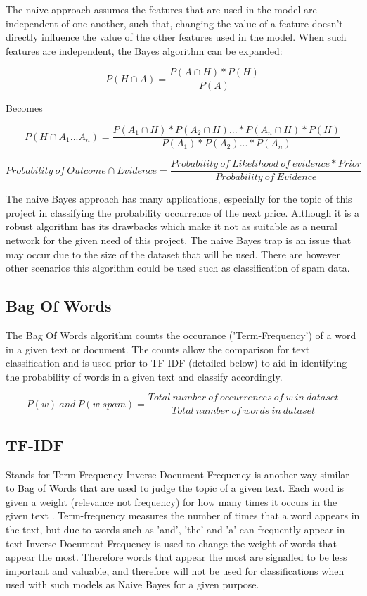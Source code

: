 \documentclass[oneside, 12pt]{article}
\begin{document}
			The naive approach assumes the features that are used in the model are independent of one another, such that, changing the value of a feature doesn't directly influence the value of the other features used in the model. When such features are independent, the Bayes algorithm can be expanded:
			
			\[P(H\cap A) = \frac{P(A\cap H) * P(H)}{P(A)} \]
			
			\begin{center}
				Becomes
			\end{center}
			
			\[P(H\cap A_1 ... A_n) = \frac{P(A_1\cap H) * P(A_2\cap H) ... * P(A_n\cap H) * P(H)}{P(A_1) * P(A_2) ... * P(A_n)} \]
			
			\[Probability \ of \ Outcome \cap Evidence = \frac{Probability \ of \ Likelihood \ of \ evidence * Prior}{Probability \ of \ Evidence} \]
			
			The naive Bayes approach has many applications, especially for the topic of this project in classifying the probability occurrence of the next price. Although it is a robust algorithm has its drawbacks which make it not as suitable as a neural network for the given need of this project. The naive Bayes trap is an issue that may occur due to the size of the dataset that will be used. There are however other scenarios this algorithm could be used such as classification of spam data.\cite{StudyNBC}
			
			\subsection{Bag Of Words}
			The Bag Of Words algorithm counts the occurance ('Term-Frequency') of a word in a given text or document. The counts allow the comparison for text classification and is used prior to TF-IDF (detailed below) to aid in identifying the probability of words in a given text and classify accordingly. \cite{TFIDFBOW}
			
			\[P(w) \ and\ P(w|spam) = \frac{Total\ number\ of\ occurrences\ of\ w\ in\ dataset}{Total\ number\ of\ words\ in\ dataset}\]
			
			\subsection{TF-IDF}
			Stands for Term Frequency-Inverse Document Frequency is another way similar to Bag of Words that are used to judge the topic of a given text. Each word is given a weight (relevance not frequency) for how many times it occurs in the given text \cite{TFIDFBOW}. 
			Term-frequency measures the number of times that a word appears in the text, but due to words such as 'and', 'the' and 'a' can frequently appear in text Inverse Document Frequency is used to change the weight of words that appear the most. Therefore words that appear the most are signalled to be less important and valuable, and therefore will not be used for classifications when used with such models as Naive Bayes for a given purpose. \cite{TFIDFBOW}
			\newline
			
\end{document}
